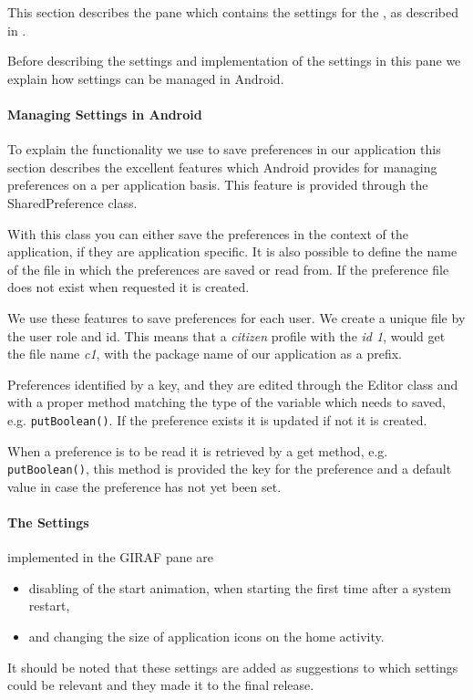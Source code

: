 This section describes the pane which contains the settings for the \launcher, as described in .

Before describing the settings and implementation of the settings in this pane we explain how settings can be managed in Android.

\paragraph{Managing Settings in Android}
To explain the functionality we use to save preferences in our application this section describes the excellent features which Android provides for managing preferences on a per application basis. This feature is provided through the SharedPreference class.

With this class you can either save the preferences in the context of the application, if they are application specific. It is also possible to define the name of the file in which the preferences are saved or read from. If the preference file does not exist when requested it is created.

We use these features to save preferences for each user. We create a unique file by the user role and id.
This means that a \textit{citizen} profile with the \textit{id 1}, would get the file name \textit{c1}, with the package name of our application as a prefix.

Preferences identified by a key, and they are edited through the Editor class and with a proper method matching the type of the variable which needs to saved, e.g. \lstinline!putBoolean()!.
If the preference exists it is updated if not it is created.

When a preference is to be read it is retrieved by a get method, e.g. \lstinline!putBoolean()!, this method is provided the key for the preference and a default value in case the preference has not yet been set.

\paragraph{The Settings} implemented in the GIRAF pane are
\begin{itemize}
 	\item disabling of the start animation, when starting \launcher the first time after a system restart,
 	\item and changing the size of application icons on the home activity.
 \end{itemize} 
It should be noted that these settings are added as suggestions to which settings could be relevant and they made it to the final release.

